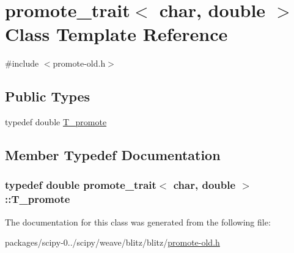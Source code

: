 \hypertarget{classpromote__trait_3_01char_00_01double_01_4}{}\section{promote\+\_\+trait$<$ char, double $>$ Class Template Reference}
\label{classpromote__trait_3_01char_00_01double_01_4}


{\ttfamily \#include $<$promote-\/old.\+h$>$}

\subsection*{Public Types}
\begin{DoxyCompactItemize}
\item 
typedef double \hyperlink{classpromote__trait_3_01char_00_01double_01_4_a475f875e69257401b7c639986fed5cc6}{T\+\_\+promote}
\end{DoxyCompactItemize}


\subsection{Member Typedef Documentation}
\hypertarget{classpromote__trait_3_01char_00_01double_01_4_a475f875e69257401b7c639986fed5cc6}{}
\subsubsection[{T\+\_\+promote}]{\setlength{\rightskip}{0pt plus 5cm}typedef double {\bf promote\+\_\+trait}$<$ char, double $>$\+::{\bf T\+\_\+promote}}\label{classpromote__trait_3_01char_00_01double_01_4_a475f875e69257401b7c639986fed5cc6}


The documentation for this class was generated from the following file\+:\begin{DoxyCompactItemize}
\item 
packages/scipy-\/0../scipy/weave/blitz/blitz/\hyperlink{promote-old_8h}{promote-\/old.\+h}\end{DoxyCompactItemize}
